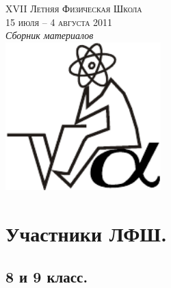 \documentclass[11pt]{article}
\newlength{\h}
\newlength{\x}
\begin{document}
\thispagestyle{empty}
\parindent=5mm
\begin{center}

\phantom{Бухалкин апанас}

\vfill
\LARGE{\textsc{XVII Летняя Физическая Школа}}\\
\Large{\textsc{15 июля -- 4 августа 2011}}\\[1cm]
\Large{\textit{Сборник материалов}}\\[2cm]
\includegraphics[width=6cm]{logo.pdf}
\vfill

\end{center}

\clearpage

\hypersetup{colorlinks,%
  linkcolor=black
}

\tableofcontents

\hypersetup{colorlinks,%
  citecolor=blue,
  urlcolor=blue,
  linkcolor=red
}


\clearpage

\section{Участники ЛФШ.}
\label{sec:participants}

\subsection{8 и 9 класс.}
\label{sec:8and9}
\end{document}
